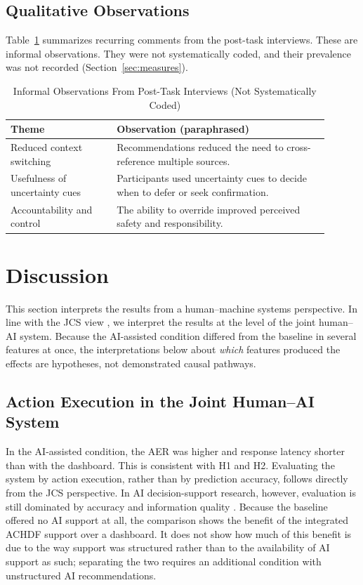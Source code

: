 \documentclass[journal]{IEEEtran}
\theoremstyle{plain}
\theoremstyle{definition}
\begin{document}
    \subsection{Qualitative Observations}
    Table~\ref{tab:qualitative} summarizes recurring comments from the post-task interviews. These are informal observations. They were not systematically coded, and their prevalence was not recorded (Section~\ref{sec:measures}).

    \begin{table}[t]
        \caption{Informal Observations From Post-Task Interviews (Not Systematically Coded)}
        \label{tab:qualitative}
        \centering
        \begin{tabular}{p{0.30\linewidth}p{0.60\linewidth}}
            \toprule
            \textbf{Theme} & \textbf{Observation (paraphrased)} \\
            \midrule
            Reduced context switching & Recommendations reduced the need to cross-reference multiple sources. \\
            Usefulness of uncertainty cues & Participants used uncertainty cues to decide when to defer or seek confirmation. \\
            Accountability and control & The ability to override improved perceived safety and responsibility. \\
            \bottomrule
        \end{tabular}
    \end{table}

\section{Discussion}
\label{sec:discussion}
This section interprets the results from a human--machine systems perspective. In line with the JCS view \cite{Hollnagel2005JCS,Woods2006JCS}, we interpret the results at the level of the joint human--AI system. Because the AI-assisted condition differed from the baseline in several features at once, the interpretations below about \emph{which} features produced the effects are hypotheses, not demonstrated causal pathways.

\subsection{Action Execution in the Joint Human--AI System}
In the AI-assisted condition, the AER was higher and response latency shorter than with the dashboard. This is consistent with H1 and H2. Evaluating the system by action execution, rather than by prediction accuracy, follows directly from the JCS perspective. In AI decision-support research, however, evaluation is still dominated by accuracy and information quality \cite{Lai2023FAccT,Muller2022CHIWORK,Yang2022THMSReview}. Because the baseline offered no AI support at all, the comparison shows the benefit of the integrated ACHDF support over a dashboard. It does not show how much of this benefit is due to the way support was structured rather than to the availability of AI support as such; separating the two requires an additional condition with unstructured AI recommendations.
\end{document}
